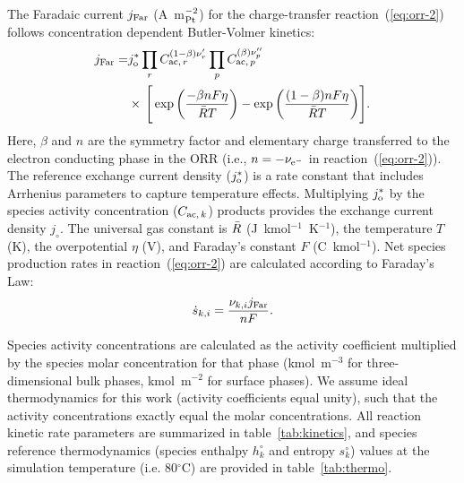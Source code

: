 \documentclass[final,3p,times,twocolumn]{elsarticle}    %
\begin{document}
The Faradaic current $j_{\rm Far}$ (A~m$^{-2}_{\rm Pt}$) for the charge-transfer reaction~(\ref{eq:orr-2}) follows concentration dependent Butler-Volmer kinetics:
\begin{equation}
\begin{split}
    j_{\rm Far} = & j_{\rm o}^{*} 
    \prod_{r} C_{{\rm ac},\,r}^{(1-\beta)\nu_{r}^{\prime}} 
    \prod_{p} C_{{\rm ac},\,p}^{(\beta)\nu_{p}^{\prime \prime}} \\
    & \times \, \Bigg[ \exp \bigg( \frac{-\beta n F \eta}{\Bar{R} T} \bigg) 
        - \exp \bigg( \frac{(1-\beta) n F \eta}{\Bar{R} T} \bigg) \Bigg].
\end{split}
\end{equation}
Here, $\beta$ and $n$ are the symmetry factor and elementary charge transferred to the electron conducting phase in the ORR (i.e., $n = -\nu_{\rm e^{-}}$ in reaction~(\ref{eq:orr-2})). The reference exchange current density ($j_{\rm o}^{*}$) is a rate constant that includes Arrhenius parameters to capture temperature effects. Multiplying $j_{\rm o}^{*}$ by the species activity concentration ($C_{{\rm ac},\,k}$) products provides the exchange current density $j_\circ$. The universal gas constant is $\Bar{R}$ (J~kmol$^{-1}$~K$^{-1}$), the temperature $T$ (K), the overpotential $\eta$ (V), and Faraday's constant $F$ (C~kmol$^{-1}$). Net species production rates in reaction~(\ref{eq:orr-2}) are calculated according to Faraday's Law:
\begin{equation}
    \dot{s}_{k,i} = \frac{\nu_{k,i} j_{\rm Far}}{n F}.
\end{equation}

Species activity concentrations are calculated as the activity coefficient multiplied by the species molar concentration for that phase (kmol~m$^{-3}$ for three-dimensional bulk phases, kmol~m$^{-2}$ for surface phases). We assume ideal thermodynamics for this work (activity coefficients equal unity), such that the activity concentrations exactly equal the molar concentrations. All reaction kinetic rate parameters are summarized in table~\ref{tab:kinetics}, and species reference thermodynamics (species enthalpy $h_k^\circ$ and entropy $s_k^\circ$) values at the simulation temperature (i.e. 80$^{\circ}$C) are provided in table~\ref{tab:thermo}.
\end{document}
